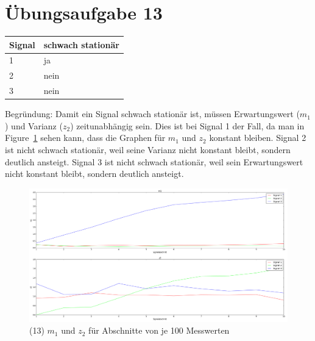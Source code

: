 
    
    \section*{Übungsaufgabe 13}
    \begin{tabular}{ | l | l | }
        \hline
        Signal & schwach stationär \\ \hline
        1 & ja \\ \hline
        2 & nein \\ \hline
        3 & nein \\ \hline
    \end{tabular}
    \newline \newline
    Begründung: \newline
    Damit ein Signal schwach stationär ist, müssen Erwartungswert ($m_1$) und Varianz ($z_2$) zeitunabhängig sein.
    Dies ist bei Signal 1 der Fall, da man in Figure~\ref{fig:m1_z2_plt} sehen kann, dass die Graphen für $m_1$ und $z_2$ konstant bleiben.
    Signal 2 ist nicht schwach stationär, weil seine Varianz nicht konstant bleibt, sondern deutlich ansteigt.
    Signal 3 ist nicht schwach stationär, weil sein Erwartungswert nicht konstant bleibt, sondern deutlich ansteigt.

    \begin{figure}
        \includegraphics[width=1.0\textwidth]{A13.png}
        \caption{(13) $m_1$ und $z_2$ für Abschnitte von je 100 Messwerten}
        \label{fig:m1_z2_plt}
    \end{figure}
